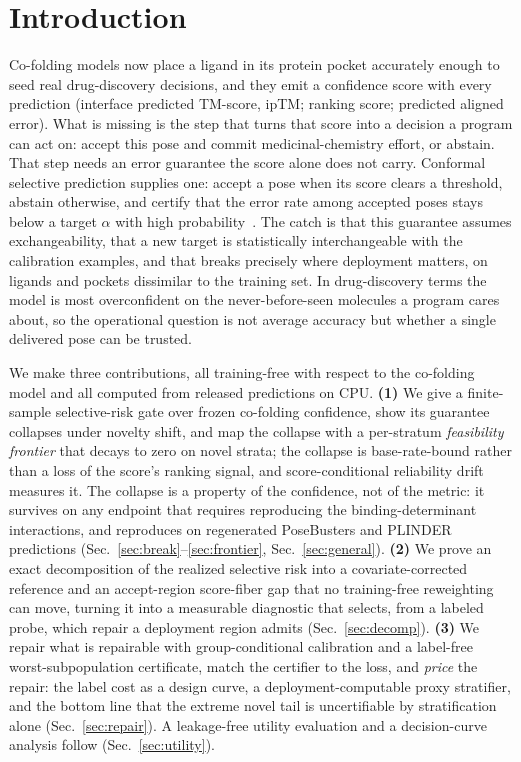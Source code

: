 \documentclass[10pt]{article}
\begin{document}
\section{Introduction}
Co-folding models now place a ligand in its protein pocket accurately enough to seed real drug-discovery
decisions, and they emit a confidence score with every prediction (interface predicted TM-score, ipTM;
ranking score; predicted aligned error). What is missing is the step that turns that score into a decision
a program can act on: accept this pose and commit medicinal-chemistry effort, or abstain. That step needs
an error guarantee the score alone does not carry. Conformal selective prediction supplies one:
accept a pose when its score clears a threshold, abstain otherwise, and certify that the error rate among
accepted poses stays below a target $\alpha$ with high probability~\citep{vovk2005,geifman2017}. The catch
is that this guarantee assumes exchangeability, that a new target is statistically interchangeable with the
calibration examples, and that breaks precisely where deployment matters, on ligands and pockets dissimilar
to the training set. In drug-discovery terms the model is most overconfident on the never-before-seen
molecules a program cares about, so the operational question is not average accuracy but whether a single
delivered pose can be trusted.

We make three contributions, all training-free with respect to the co-folding model and all computed from
released predictions on CPU.
\textbf{(1)} We give a finite-sample selective-risk gate over frozen co-folding confidence, show its
guarantee collapses under novelty shift, and map the collapse with a per-stratum \emph{feasibility
frontier} that decays to zero on novel strata; the collapse is base-rate-bound rather than a loss of the
score's ranking signal, and score-conditional reliability drift measures it. The collapse is a property of
the confidence, not of the metric: it survives on any endpoint that requires reproducing the
binding-determinant interactions, and reproduces on regenerated PoseBusters and PLINDER predictions
(Sec.~\ref{sec:break}--\ref{sec:frontier}, Sec.~\ref{sec:general}).
\textbf{(2)} We prove an exact decomposition of the realized selective risk into a covariate-corrected
reference and an accept-region score-fiber gap that no training-free reweighting can move, turning it into a
measurable diagnostic that selects, from a labeled probe, which repair a deployment region admits
(Sec.~\ref{sec:decomp}).
\textbf{(3)} We repair what is repairable with group-conditional calibration and a label-free
worst-subpopulation certificate, match the certifier to the loss, and \emph{price} the repair: the label
cost as a design curve, a deployment-computable proxy stratifier, and the bottom line that the
extreme novel tail is uncertifiable by stratification alone (Sec.~\ref{sec:repair}). A leakage-free utility
evaluation and a decision-curve analysis follow (Sec.~\ref{sec:utility}).
\end{document}
